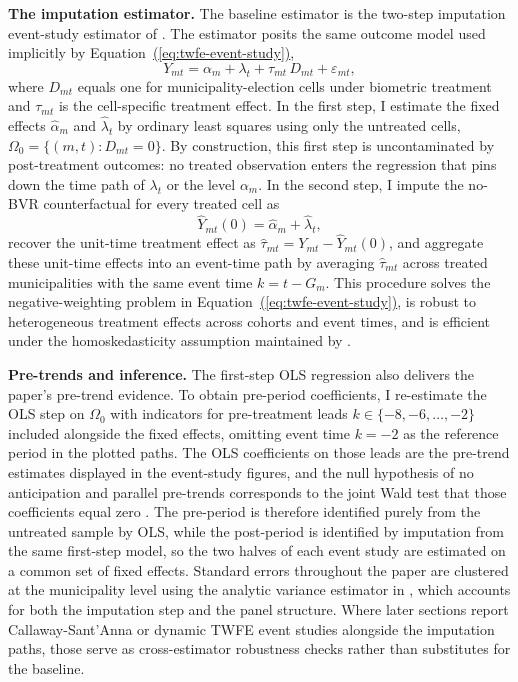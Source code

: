 \textbf{The imputation estimator.} The baseline estimator is the two-step imputation event-study estimator of \citet{Borusyak2024RevisitiEventStudy}. The estimator posits the same outcome model used implicitly by Equation~\hyperref[eq:twfe-event-study]{(\ref*{eq:twfe-event-study})},
\begin{equation}
\label{eq:bjs-model}
Y_{mt} = \alpha_m + \lambda_t + \tau_{mt}\,D_{mt} + \varepsilon_{mt},
\end{equation}
where $D_{mt}$ equals one for municipality-election cells under biometric treatment and $\tau_{mt}$ is the cell-specific treatment effect. In the first step, I estimate the fixed effects $\hat{\alpha}_m$ and $\hat{\lambda}_t$ by ordinary least squares using only the untreated cells, $\Omega_0 = \{(m,t): D_{mt} = 0\}$. By construction, this first step is uncontaminated by post-treatment outcomes: no treated observation enters the regression that pins down the time path of $\lambda_t$ or the level $\alpha_m$. In the second step, I impute the no-BVR counterfactual for every treated cell as
\[
\widehat{Y}_{mt}(0) = \hat{\alpha}_m + \hat{\lambda}_t,
\]
recover the unit-time treatment effect as $\hat{\tau}_{mt} = Y_{mt} - \widehat{Y}_{mt}(0)$, and aggregate these unit-time effects into an event-time path by averaging $\hat{\tau}_{mt}$ across treated municipalities with the same event time $k = t - G_m$. This procedure solves the negative-weighting problem in Equation~\hyperref[eq:twfe-event-study]{(\ref*{eq:twfe-event-study})}, is robust to heterogeneous treatment effects across cohorts and event times, and is efficient under the homoskedasticity assumption maintained by \citet{Borusyak2024RevisitiEventStudy}.

\textbf{Pre-trends and inference.} The first-step OLS regression also delivers the paper's pre-trend evidence. To obtain pre-period coefficients, I re-estimate the OLS step on $\Omega_0$ with indicators for pre-treatment leads $k \in \{-8, -6, \ldots, -2\}$ included alongside the fixed effects, omitting event time $k = -2$ as the reference period in the plotted paths. The OLS coefficients on those leads are the pre-trend estimates displayed in the event-study figures, and the null hypothesis of no anticipation and parallel pre-trends corresponds to the joint Wald test that those coefficients equal zero \citep{Borusyak2024RevisitiEventStudy}. The pre-period is therefore identified purely from the untreated sample by OLS, while the post-period is identified by imputation from the same first-step model, so the two halves of each event study are estimated on a common set of fixed effects. Standard errors throughout the paper are clustered at the municipality level using the analytic variance estimator in \citet{Borusyak2024RevisitiEventStudy}, which accounts for both the imputation step and the panel structure. Where later sections report Callaway-Sant'Anna or dynamic TWFE event studies alongside the imputation paths, those serve as cross-estimator robustness checks rather than substitutes for the baseline.

